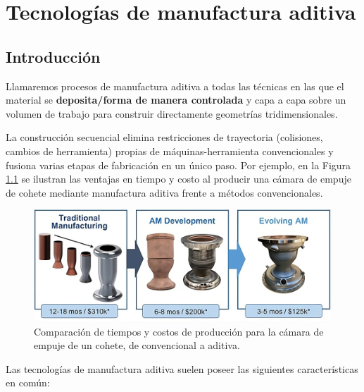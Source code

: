 \chapter{Tecnologías de manufactura aditiva}

\section{Introducción}

Llamaremos procesos de manufactura aditiva a todas las técnicas en las que el material se \textbf
{deposita/forma de manera controlada} y capa a capa sobre un volumen de trabajo para construir directamente geometrías tridimensionales. 

La construcción secuencial elimina restricciones de trayectoria (colisiones, cambios de herramienta) propias de máquinas-herramienta convencionales y fusiona varias etapas de fabricación en un único paso. Por ejemplo, en la Figura \ref{roki} se ilustran las ventajas en tiempo y costo al producir una cámara de empuje de cohete mediante manufactura aditiva frente a métodos convencionales. 

\begin{figure}[h!]
	\centering
	\includegraphics[width=0.8\linewidth]{imgs/rocket.png}
	\caption{Comparación de tiempos y costos de producción para la cámara de empuje de un cohete, de convencional a aditiva.\cite{rokeke}}
	\label{roki}
\end{figure}

Las tecnologías de manufactura aditiva suelen poseer las siguientes características en común:


